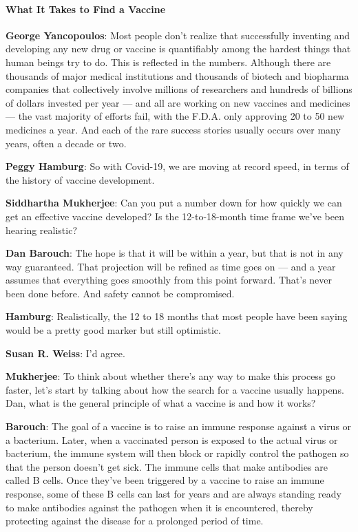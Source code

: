 \hypertarget{what-it-takes-to-find-a-vaccine}{%
\paragraph{What It Takes to Find a
Vaccine}\label{what-it-takes-to-find-a-vaccine}}

\textbf{George Yancopoulos}: Most people don't realize that successfully
inventing and developing any new drug or vaccine is quantifiably among
the hardest things that human beings try to do. This is reflected in the
numbers. Although there are thousands of major medical institutions and
thousands of biotech and biopharma companies that collectively involve
millions of researchers and hundreds of billions of dollars invested per
year --- and all are working on new vaccines and medicines --- the vast
majority of efforts fail, with the F.D.A. only approving 20 to 50 new
medicines a year. And each of the rare success stories usually occurs
over many years, often a decade or two.

\textbf{Peggy Hamburg}: So with Covid-19, we are moving at record speed,
in terms of the history of vaccine development.

\textbf{Siddhartha Mukherjee}: Can you put a number down for how quickly
we can get an effective vaccine developed? Is the 12-to-18-month time
frame we've been hearing realistic?

\textbf{Dan Barouch}: The hope is that it will be within a year, but
that is not in any way guaranteed. That projection will be refined as
time goes on --- and a year assumes that everything goes smoothly from
this point forward. That's never been done before. And safety cannot be
compromised.

\textbf{Hamburg}: Realistically, the 12 to 18 months that most people
have been saying would be a pretty good marker but still optimistic.

\textbf{Susan R. Weiss}: I'd agree.

\textbf{Mukherjee}: To think about whether there's any way to make this
process go faster, let's start by talking about how the search for a
vaccine usually happens. Dan, what is the general principle of what a
vaccine is and how it works?

\textbf{Barouch}: The goal of a vaccine is to raise an immune response
against a virus or a bacterium. Later, when a vaccinated person is
exposed to the actual virus or bacterium, the immune system will then
block or rapidly control the pathogen so that the person doesn't get
sick. The immune cells that make antibodies are called B cells. Once
they've been triggered by a vaccine to raise an immune response, some of
these B cells can last for years and are always standing ready to make
antibodies against the pathogen when it is encountered, thereby
protecting against the disease for a prolonged period of time.

